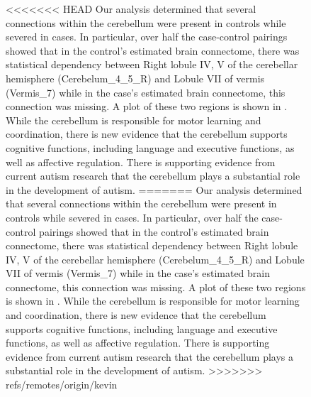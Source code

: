 \documentclass{nature}
\begin{document}
\begin{figure}[tb]
<<<<<<< HEAD
Our analysis determined that several connections within the cerebellum were present
in controls while severed in cases. In particular, over half the case-control
pairings showed that in the control's estimated brain connectome, 
there was statistical dependency between Right lobule IV, V of the cerebellar
hemisphere (Cerebelum\_4\_5\_R) and Lobule VII of vermis (Vermis\_7) while in the
case's estimated brain connectome, this connection was missing. A plot
of these two regions is shown in . While the cerebellum
is responsible for motor learning and coordination, there is new evidence that
the cerebellum supports cognitive functions, including language and executive functions,
as well as affective regulation\cite{goines2011autoantibodies,braunschweig2012maternal}.
There is supporting evidence from current autism research that the cerebellum plays
a substantial role in the development of autism\cite{d2015cerebellar,becker2013autism,wang2014cerebellum}.
=======
Our analysis determined that several connections within the cerebellum were
present
in controls while severed in cases. In particular, over half the case-control
pairings showed that in the control's estimated brain connectome, 
there was statistical dependency between Right lobule IV, V of the cerebellar
hemisphere (Cerebelum\_4\_5\_R) and Lobule VII of vermis (Vermis\_7) while in
the
case's estimated brain connectome, this connection was missing. A plot
of these two regions is shown in . While the cerebellum
is responsible for motor learning and coordination, there is new evidence that
the cerebellum supports cognitive functions, including language and executive
functions,
as well as affective
regulation\cite{goines2011autoantibodies,braunschweig2012maternal}.
There is supporting evidence from current autism research that the cerebellum
plays
a substantial role in the development of
autism\cite{d2015cerebellar,becker2013autism,wang2014cerebellum}.
>>>>>>> refs/remotes/origin/kevin


\end{figure}
\end{document}

